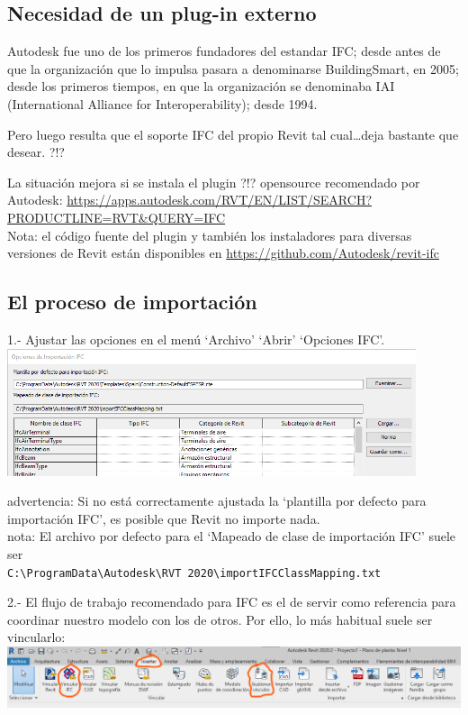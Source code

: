 \documentclass[spanish,12pt,a4paper,final,oneside]{book}
\begin{document}
\subsection{Necesidad de un plug-in externo}
Autodesk fue uno de los primeros fundadores del estandar IFC; desde antes de que la organización que lo impulsa pasara a denominarse BuildingSmart, en 2005; desde los primeros tiempos, en que la organización se denominaba IAI (International Alliance for Interoperability); desde 1994. 

Pero luego resulta que el soporte IFC del propio Revit tal cual\ldots	deja bastante que desear. ?!?

La situación mejora si se instala el plugin ?!? opensource recomendado por Autodesk: \url{https://apps.autodesk.com/RVT/EN/LIST/SEARCH?PRODUCTLINE=RVT&QUERY=IFC}
\\Nota: el código fuente del plugin y también los instaladores para diversas versiones de Revit están disponibles en \url{https://github.com/Autodesk/revit-ifc} 


\subsection{El proceso de importación}
1.- Ajustar las opciones en el menú `Archivo' `Abrir' `Opciones IFC'. 
\\ \includegraphics[width=0.9\textwidth]{Revit - archivo - abrir - opciones IFC}
\\ \begin{footnotesize}advertencia: Si no está correctamente ajustada la `plantilla por defecto para importación IFC', es posible que Revit no importe nada.
\\nota: El archivo por defecto para el `Mapeado de clase de importación IFC' suele ser
\\ \verb!C:\ProgramData\Autodesk\RVT 2020\importIFCClassMapping.txt!\end{footnotesize}

\vspace{0.3cm}
2.- El flujo de trabajo recomendado para IFC es el de servir como referencia para coordinar nuestro modelo con los de otros. Por ello, lo más habitual suele ser vincularlo:
\\ \includegraphics[width=\textwidth]{Revit - vincular un modelo IFC}
\end{document}
